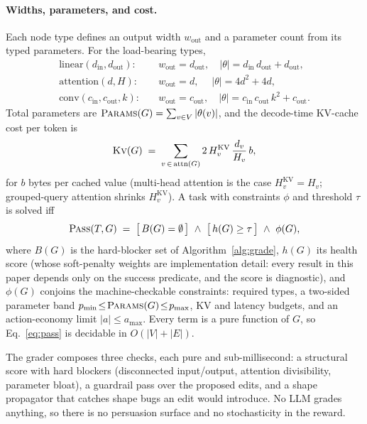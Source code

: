 \documentclass[11pt]{article}
\begin{document}
\paragraph{Widths, parameters, and cost.} Each node type defines an output width $w_{\text{out}}$ and a parameter count from its typed parameters. For the load-bearing types,
\begin{align}
\text{linear}(d_{\text{in}}, d_{\text{out}})\!: &\quad w_{\text{out}} = d_{\text{out}}, \quad |\theta| = d_{\text{in}}\,d_{\text{out}} + d_{\text{out}}, \label{eq:lin}\\
\text{attention}(d, H)\!: &\quad w_{\text{out}} = d, \quad\; |\theta| = 4 d^2 + 4 d, \label{eq:attn}\\
\text{conv}(c_{\text{in}}, c_{\text{out}}, k)\!: &\quad w_{\text{out}} = c_{\text{out}}, \quad |\theta| = c_{\text{in}}\,c_{\text{out}}\,k^2 + c_{\text{out}}. \label{eq:conv}
\end{align}
Total parameters are $\textsc{Params}(G)=\sum_{v\in V}|\theta(v)|$, and the decode-time KV-cache cost per token is
\begin{equation}
\textsc{Kv}(G) \;=\; \sum_{v\,\in\,\text{attn}(G)} 2\,H^{\text{KV}}_v\,\frac{d_v}{H_v}\,b, \label{eq:kv}
\end{equation}
for $b$ bytes per cached value (multi-head attention is the case $H^{\text{KV}}_v = H_v$; grouped-query attention shrinks $H^{\text{KV}}_v$). A task with constraints $\phi$ and threshold $\tau$ is solved iff
\begin{equation}
\textsc{Pass}(T, G) \;=\; \big[\,B(G)=\emptyset\,\big]\ \wedge\ \big[\,h(G)\ge\tau\,\big]\ \wedge\ \phi(G), \label{eq:pass}
\end{equation}
where $B(G)$ is the hard-blocker set of Algorithm~\ref{alg:grade}, $h(G)$ its health score (whose soft-penalty weights are implementation detail: every result in this paper depends only on the success predicate, and the score is diagnostic), and $\phi(G)$ conjoins the machine-checkable constraints: required types, a two-sided parameter band $p_{\min}\!\le\!\textsc{Params}(G)\!\le\!p_{\max}$, KV and latency budgets, and an action-economy limit $|a|\le a_{\max}$. Every term is a pure function of $G$, so Eq.~\eqref{eq:pass} is decidable in $O(|V|+|E|)$.

The grader composes three checks, each pure and sub-millisecond: a structural score with hard blockers (disconnected input/output, attention divisibility, parameter bloat), a guardrail pass over the proposed edits, and a shape propagator that catches shape bugs an edit would introduce. No LLM grades anything, so there is no persuasion surface and no stochasticity in the reward.
\end{document}
